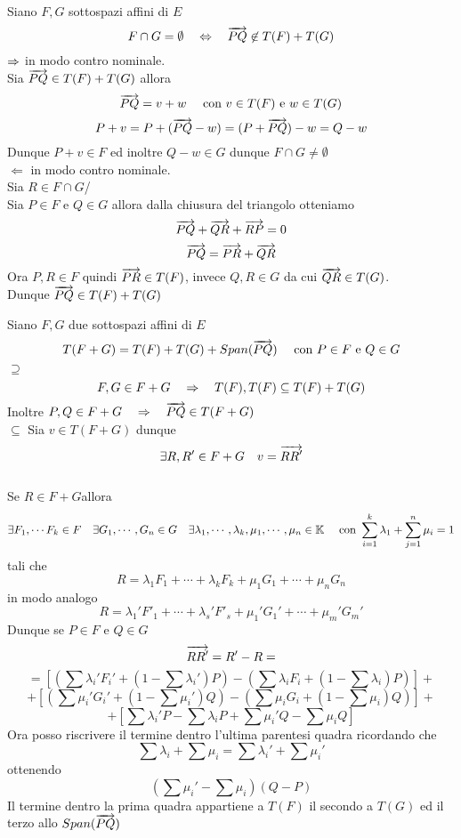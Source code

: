 \spazio
\begin{lem}\label{intersezione}Siano $F,G$ sottospazi affini di $E$
$$ F \cap G = \emptyset \quad \Leftrightarrow \quad \overrightarrow{PQ} \not \in T(F)+T(G)$$
\proof $\Rightarrow$ in modo contro nominale.\\
Sia $\overrightarrow{PQ} \in T(F)+T(G)$ allora
$$\overrightarrow{PQ} = v+w \quad  \text{ con } v\in T(F)  \text{ e } w \in T(G)$$
$$ P+v = P + ( \overrightarrow{PQ}-w ) = ( P+\overrightarrow{PQ} )-w = Q-w $$
Dunque $P+v \in F $ ed inoltre $Q-w \in G $ dunque $F \cap G \neq \emptyset$\\
$\Leftarrow$  in modo contro nominale.\\Sia $R \in F \cap G $/\\
Sia $P \in F $ e  $ Q \in G $ allora dalla chiusura del triangolo otteniamo 
$$ \overrightarrow{PQ} + \overrightarrow{ QR } + \overrightarrow{ RP} = 0 $$
$$ \overrightarrow{PQ} = \overrightarrow{PR} + \overrightarrow{QR}$$
Ora $P,R \in F $ quindi $\overrightarrow{PR} \in T(F) $, invece $Q,R \in G $ da cui $\overrightarrow{QR} \in T(G)$.\\
Dunque $ \overrightarrow{PQ} \in T(F) + T(G)$
\endproof
\end{lem}
\spazio
\begin{prop}\bianco
Siano $F,G$ due sottospazi affini di $E$
$$T(F+G) = T(F) + T(G) + Span(\overrightarrow{PQ} ) \quad \text{ con } P \in F \text{ e } Q \in G $$
\proof $\supseteq$
$$F, G \in F+G \quad \Rightarrow  \quad T(F),T(F) \subseteq T(F) + T(G) $$
Inoltre $P,Q \in F+G \quad \Rightarrow \quad \overrightarrow{PQ} \in T(F+G)$\\
$\subseteq$ Sia $v \in T(F+G) $ dunque $$\exists R,R' \in F+G \quad  v= \overrightarrow{RR'}$$ \\
Se  $R\in F+G $allora
$$  \exists F_1, \cdots F_k \in F \quad \exists G_1, \cdots , G_n \in G\quad \exists \lambda_1, \cdots , \lambda_k, \mu_1, \cdots , \mu_n \in \mathbb{K} \quad \text{ con } \sum_{i=1}^k \lambda_1 + \sum_{j=1}^n \mu_i=1$$
tali che 
$$ R = \lambda_1 F_1 + \cdots + \lambda_k F_k +\mu_1 G_1 + \cdots + \mu_n G_n $$
in modo analogo
$$ R = \lambda_1' F'_1 + \cdots + \lambda_s' F'_s +\mu_1' G_1' + \cdots + \mu_m' G_m' $$
Dunque se $P\in F $ e $ Q \in G$
$$ \overrightarrow{RR'}=R'-R = $$ $$= \left[ \left( \sum \lambda_i' F_i' + \left( 1 -\sum \lambda_i '  \right) P \right) - \left( \sum \lambda_i F_i + \left( 1 -\sum \lambda_i \right) P \right) \right] +  $$
$$ +  \left[   \left( \sum \mu_i' G_i'  + \left( 1 - \sum \mu_i' \right)Q \right) -  \left( \sum \mu_i G_i + \left( 1- \sum \mu_i \right) Q \right)\right] +$$
$$ + \left[ \sum \lambda_i' P - \sum \lambda_i P + \sum \mu_i' Q - \sum \mu_i Q \right]$$
Ora  posso riscrivere il termine dentro l'ultima parentesi quadra ricordando che 
$$\sum \lambda_i + \sum \mu_i = \sum\lambda_i' + \sum \mu_i'$$ ottenendo
$$ \left( \sum \mu_i'- \sum \mu_i \right) ( Q-P) $$
Il termine dentro la prima quadra appartiene a $T(F)$ il secondo a $T(G)$ ed il terzo allo $Span(\overrightarrow{PQ})$\\
\endproof
\end{prop}
